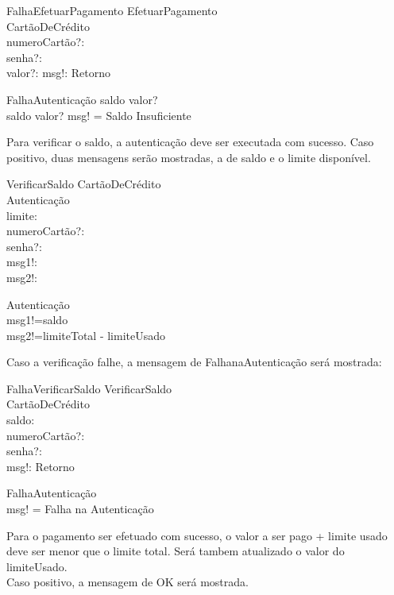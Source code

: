 \documentclass{article}
\begin{document}
\begin{schema}{FalhaEfetuarPagamento}
    \Xi EfetuarPagamento\\
    \Xi CartãoDeCrédito\\
    numeroCartão?: \nat\\
    senha?: \nat\\
    valor?: \real
    msg!: Retorno

    \where
    \Xi FalhaAutenticação \lor saldo \leq valor?\\
    \IF saldo \leq valor? \THEN msg! = Saldo Insuficiente
    
\end{schema}

Para verificar o saldo, a autenticação deve ser executada com sucesso. Caso positivo, duas mensagens serão mostradas, a de saldo e o limite disponível.

\begin{schema}{VerificarSaldo}
    \Xi CartãoDeCrédito\\
    \Xi Autenticação\\
    limite:\real \\
    numeroCartão?: \nat\\
    senha?: \nat\\
    msg1!: \real\\
    msg2!: \real
    
    \where
    
    \Xi Autenticação\\
    msg1!=saldo\\
    msg2!=limiteTotal - limiteUsado
\end{schema}

Caso a verificação falhe, a mensagem de FalhanaAutenticação será mostrada:

\begin{schema}{FalhaVerificarSaldo}
    \Xi VerificarSaldo\\
    \Xi CartãoDeCrédito\\
    saldo: \real\\
    numeroCartão?: \nat\\
    senha?: \nat\\
    msg!: Retorno
    
    \where
    
    \Xi FalhaAutenticação\\
    msg! = Falha na Autenticação
\end{schema}

\pagebreak

Para o pagamento ser efetuado com sucesso, o valor a ser pago + limite usado deve ser menor que o limite total. Será tambem atualizado o valor do limiteUsado.\\
Caso positivo, a mensagem de OK será mostrada.
\end{document}
